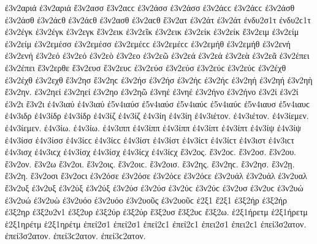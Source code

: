 {ἐ3ν2αριά ἐ3ν2αριά 
ἔ3ν2ασσ ἔ3ν2αϲϲ   %
ἐ3ν2άσσ ἐ3ν2άσσ ἐ3ν2άϲϲ ἐ3ν2άϲϲ 
ἐ3ν2άσθ ἐ3ν2άσθ ἐ3ν2άϲθ ἐ3ν2άϲθ 
ἐ3ν2ασθ ἐ3ν2αϲθ 
ἔ3ν2ατ   %
ἐ3ν2άτ ἐ3ν2άτ 
ἐνδυ2σ1τ ἐνδυ2ϲ1τ   %
ἐ3ν2έγκ ἐ3ν2έγκ   %
ἐ3ν2εγκ   %
ἔ3ν2εικ   %
ἐ3ν2εῖκ   %
ἐ3ν2εικ   %
ἐ3ν2είκ ἐ3ν2είκ   %
ἔ3ν2ειμ   %
ἐ3ν2είμ ἐ3ν2είμ 
ἐ3ν2εμέσσ ἐ3ν2εμέσσ ἐ3ν2εμέϲϲ ἐ3ν2εμέϲϲ   %
ἐ3ν2εμήθ ἐ3ν2εμήθ   %
ἐ3ν2ενή ἐ3ν2ενή   %
ἐ3ν2εό ἐ3ν2εό   %
ἐ3ν2εὸ 
ἐ3ν2εο 
ἐ3ν2εῶ 
ἐ3ν2εά ἐ3ν2εά 
ἐ3ν2εὰ 
ἐ3ν2εᾶ 
ἐ3ν2έπει ἐ3ν2έπει 
ἔ3ν2ερθε   %
ἔ3ν2ευσ ἔ3ν2ευϲ   %
ἐ3ν2εύσ ἐ3ν2εύσ ἐ3ν2εύϲ ἐ3ν2εύϲ   %
ἐ3ν2έχθ ἐ3ν2έχθ   %
ἐ3ν2εχθ 
ἔ3ν2ησ ἔ3ν2ηϲ   %
ἐ3ν2ήσ ἐ3ν2ήσ ἐ3ν2ήϲ ἐ3ν2ήϲ 
ἐ3ν2ηή ἐ3ν2ηή   %
ἐ3ν2ηὴ 
ἔ3ν2ην.   %
ἐ3ν2ηεί ἐ3ν2ηεί   %
ἐ3ν2ηο 
ἐ3ν2ηῶ 
ἐ3νηέ ἐ3νηέ 
ἐ3ν2ήνο ἐ3ν2ήνο   %
ἐ3ν2ί ἐ3ν2ί 
ἐ3ν2ι 
ἔ3ν2ι 
ἐ4ν3ιαύ ἐ4ν3ιαύ   %
ἐ5ν4ιαύσ ἐ5ν4ιαύσ ἐ5ν4ιαύϲ ἐ5ν4ιαύϲ   %
ἐ5ν4ιαυσ ἐ5ν4ιαυϲ 
ἐ4ν3ιδρ   %
ἐ4ν3ίδρ ἐ4ν3ίδρ   %
ἐ4ν3ίζ ἐ4ν3ίζ   %
ἐ4ν3ίη ἐ4ν3ίη   %
ἐ4ν3ιέτον. ἐ4ν3ιέτον. 
ἐ4ν3ίεμεν. ἐ4ν3ίεμεν. 
ἐ4ν3ίω. ἐ4ν3ίω. 
ἐ4ν3ιππ   %
ἐ4ν3ίππ ἐ4ν3ίππ   %
ἐ4ν3ίπτ ἐ4ν3ίπτ   %
ἐ4ν3ίψ ἐ4ν3ίψ 
ἐ4ν3ίσσ ἐ4ν3ίσσ ἐ4ν3ίϲϲ ἐ4ν3ίϲϲ   %
ἐ4ν3ίστ ἐ4ν3ίστ ἐ4ν3ίϲτ ἐ4ν3ίϲτ   %
ἐ4ν3ιστ ἐ4ν3ιϲτ 
ἐ4ν3ισχ ἐ4ν3ιϲχ   %
ἐ4ν3ίσχ ἐ4ν3ίσχ ἐ4ν3ίϲχ ἐ4ν3ίϲχ   %
ἔ3ν2ος. ἔ3ν2οϲ.   %
ἔ3ν2οσ. 
ἔ3ν2ου. 
ἔ3ν2ον. 
ἔ3ν2ω 
ἔ3ν2οι. 
ἔ3ν2οις. ἔ3ν2οιϲ. 
ἔ3ν2οισ. 
ἔ3ν2ης. ἔ3ν2ηϲ. 
ἔ3ν2ησ. 
ἔ3ν2ῃ. 
ἔ3ν2η. 
ἔ3ν2οσι ἔ3ν2οϲι   %
ἐ3ν2όσε ἐ3ν2όσε ἐ3ν2όϲε ἐ3ν2όϲε 
ἐ3ν2υάλ ἐ3ν2υάλ   %
ἐ3ν2υαλ 
ἔ3ν2υξ   %
ἐ3ν2υξ   %
ἐ3ν2ύξ ἐ3ν2ύξ   %
ἐ3ν2ύσ ἐ3ν2ύσ ἐ3ν2ύϲ ἐ3ν2ύϲ   %
ἐ3ν2υσ ἐ3ν2υϲ 
ἐ3ν2υώ ἐ3ν2υώ   %
ἐ3ν2υὼ 
ἐ3ν2υόο ἐ3ν2υόο 
ἐ3ν2υοῦς ἐ3ν2υοῦϲ 
ἐ2ξ1 
ἔ2ξ1 
ἐ3ξ2ήρ ἐ3ξ2ήρ   %
ἐ3ξ2ηρ   %
ἐ3ξ2υ2ν1   %
ἐ3ξ2υρ   %
ἐ3ξ2ύρ ἐ3ξ2ύρ   %
ἔ3ξ2υσ ἔ3ξ2υϲ   %
ἔ3ξ2ω. 
ἑ2ξ1ήρετμ ἑ2ξ1ήρετμ   %
ἑ2ξ1ηρέτμ ἑ2ξ1ηρέτμ 
ἐπεί2σ1 ἐπεί2σ1 ἐπεί2ϲ1 ἐπεί2ϲ1   %
ἐπει2σ1 ἐπει2ϲ1 
ἐπεί3σ2ατον. ἐπεί3σ2ατον. ἐπεί3ϲ2ατον. ἐπεί3ϲ2ατον.   %
}
